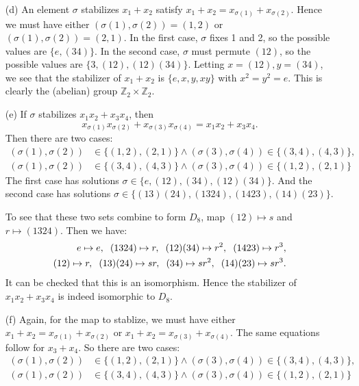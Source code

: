 \documentclass[12pt]{article}
\theoremstyle{remark}
\theoremstyle{named}
\begin{document}
\begin{enumerate}
\begin{enumerate}
        \item[(d)] An element \(\sigma\) stabilizes \(x_1 + x_2\) satisfy \(x_1 + x_2 = x_{\sigma(1)} + x_{\sigma(2)}\). Hence we must have either \((\sigma(1), \sigma(2)) = (1, 2)\) or \((\sigma(1), \sigma(2)) = (2, 1)\). In the first case, \(\sigma\) fixes 1 and 2, so the possible values are \(\{e, (34)\}\). 
        In the second case, \(\sigma\) must permute \((12)\), so the possible values are \(\{3, (12), (12)(34)\}\). Letting \(x = (12), y = (34)\), we see that the stabilizer of \(x_1+ x_2\) is \(\{e, x, y, xy\}\) with \(x^2 = y^2 = e\). This is clearly the (abelian) group \(\mathbb Z_2 \times \mathbb Z_2\). 

        \item[(e)] If \(\sigma\) stabilizes \(x_1 x_2 + x_3 x_4\), then 
        \[x_{\sigma(1)}x_{\sigma(2)} + x_{\sigma(3)} x_{\sigma(4)} = x_1 x_2 + x_3 x_4.\]
        Then there are two cases:
        \begin{align*}
            (\sigma(1), \sigma(2)) &\in \{(1, 2), (2, 1)\} \land (\sigma(3), \sigma(4)) \in \{(3, 4), (4, 3)\}, \\
            (\sigma(1), \sigma(2)) &\in \{(3, 4), (4, 3)\} \land (\sigma(3), \sigma(4)) \in \{(1, 2), (2, 1)\}
        \end{align*}
        The first case has solutions \(\sigma \in \{e, (12), (34), (12)(34)\}\). And the second case has solutions \(\sigma \in \{(13)(24), (1324), (1423), (14)(23)\}\). 

        To see that these two sets combine to form \(D_8\), map \((12) \mapsto s\) and \(r \mapsto (1324)\). Then we have:
        \begin{align*}
            e \mapsto e, \hspace{2mm} (1324) \mapsto r, \hspace{2mm} (12)(34) \mapsto r^2, \hspace{2mm} (1423) \mapsto r^3, \\ 
            (12) \mapsto r, \hspace{2mm} (13)(24) \mapsto sr, \hspace{2mm} (34) \mapsto sr^2, \hspace{2mm} (14)(23) \mapsto sr^3.
        \end{align*}
        It can be checked that this is an isomorphism. Hence the stabilizer of \(x_1 x_2 + x_3 x_4\) is indeed isomorphic to \(D_8\).

        \item[(f)] Again, for the map to stablize, we must have either \(x_1 + x_2 = x_{\sigma(1)} + x_{\sigma(2)}\) or \(x_1 + x_2 = x_{\sigma(3)} + x_{\sigma(4)}\). The same equations follow for \(x_3 + x_4\). So there are two cases:
        \begin{align*}
            (\sigma(1), \sigma(2)) &\in \{(1, 2), (2, 1)\} \land (\sigma(3), \sigma(4)) \in \{(3, 4), (4, 3)\}, \\
            (\sigma(1), \sigma(2)) &\in \{(3, 4), (4, 3)\} \land (\sigma(3), \sigma(4)) \in \{(1, 2), (2, 1)\}
        \end{align*}


\end{enumerate}
\end{enumerate}
\end{document}
